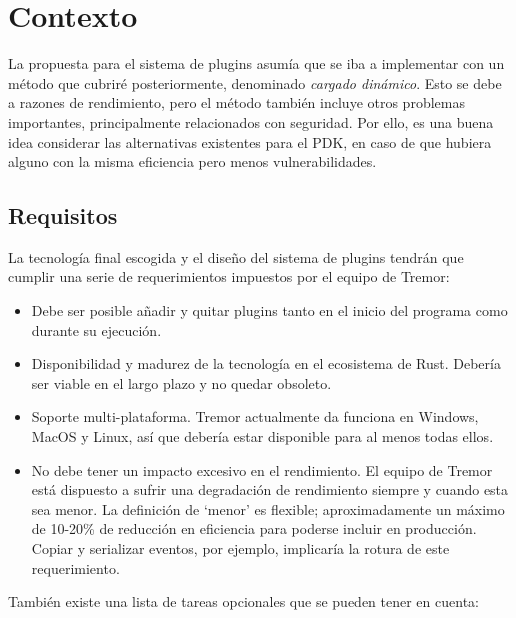 
\chapter{Contexto}\label{sec:investigation}

La propuesta para el sistema de plugins asumía que se iba a implementar con un
método que cubriré posteriormente, denominado \emph{cargado dinámico}. Esto se
debe a razones de rendimiento, pero el método también incluye otros problemas
importantes, principalmente relacionados con seguridad. Por ello, es una buena
idea considerar las alternativas existentes para el PDK, en caso de que hubiera
alguno con la misma eficiencia pero menos vulnerabilidades.

\section{Requisitos}

La tecnología final escogida y el diseño del sistema de plugins tendrán que
cumplir una serie de requerimientos impuestos por el equipo de Tremor:

\begin{itemize}
    \item Debe ser posible añadir y quitar plugins tanto en el inicio del
        programa como durante su ejecución.

    \item Disponibilidad y madurez de la tecnología en el ecosistema de Rust.
        Debería ser viable en el largo plazo y no quedar obsoleto.

    \item Soporte multi-plataforma. Tremor actualmente da funciona en Windows,
        MacOS y Linux, así que debería estar disponible para al menos todas
        ellos.

    \item No debe tener un impacto excesivo en el rendimiento. El equipo de
        Tremor está dispuesto a sufrir una degradación de rendimiento siempre y
        cuando esta sea menor. La definición de `menor' es flexible;
        aproximadamente un máximo de 10-20\% de reducción en eficiencia para
        poderse incluir en producción. Copiar y serializar eventos, por ejemplo,
        implicaría la rotura de este requerimiento.

\end{itemize}

También existe una lista de tareas opcionales que se pueden tener en cuenta:

